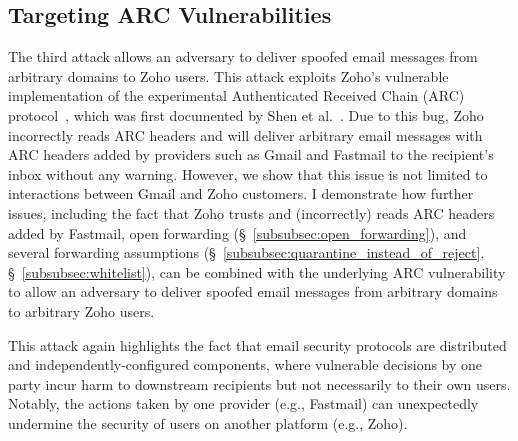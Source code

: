 \subsection{Targeting ARC Vulnerabilities}
\label{subsec:attack_zoho_arc}
The third attack allows an adversary to deliver spoofed email messages
from arbitrary domains to Zoho users.  This attack exploits Zoho's
vulnerable implementation of the experimental Authenticated Received
Chain (ARC) protocol~\cite{ARCSpeci1:online}, which was first
documented by Shen et al.~\cite{shen2020weak}. Due to this bug, Zoho
incorrectly reads ARC headers and will deliver arbitrary email
messages with ARC headers added by providers such as Gmail and
Fastmail to the recipient's inbox without any warning.  However, we
show that this issue is not limited to interactions between Gmail and
Zoho customers.  I demonstrate how further issues, including the fact that
Zoho trusts and (incorrectly) reads ARC headers added by Fastmail, open forwarding
(\S~\ref{subsubsec:open_forwarding}), and several forwarding
assumptions (\S~\ref{subsubsec:quarantine_instead_of_reject},
\S~\ref{subsubsec:whitelist}), can be combined with the underlying ARC
vulnerability to allow an adversary to deliver spoofed email messages
from arbitrary domains to arbitrary Zoho users.

This attack again highlights the fact that email security protocols
are distributed and independently-configured components, where
vulnerable decisions by one party incur harm to downstream recipients
but not necessarily to their own users.  Notably, the actions taken
by one provider (e.g., Fastmail) can unexpectedly undermine the
security of users on another platform (e.g., Zoho).



